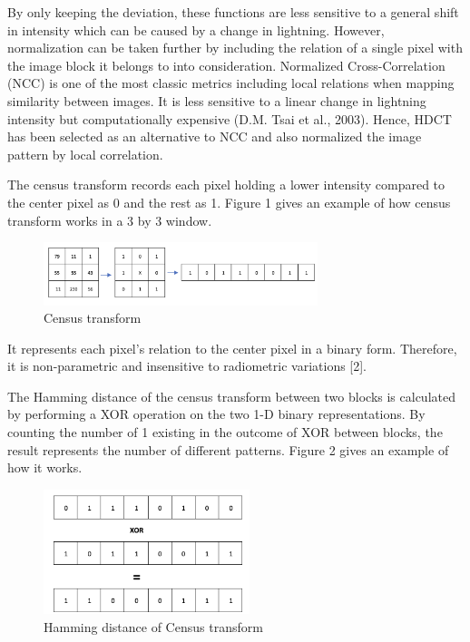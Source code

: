 \documentclass[conference]{IEEEtran}
\begin{document}
By only keeping the deviation, these functions are less sensitive to a general shift in intensity which can be caused by a change in lightning. However, normalization can be taken further by including the relation of a single pixel with the image block it belongs to into consideration. Normalized Cross-Correlation (NCC) is one of the most classic metrics including local relations when mapping similarity between images. It is less sensitive to a linear change in lightning intensity but computationally expensive (D.M. Tsai et al., 2003). Hence, HDCT has been selected as an alternative to NCC and also normalized the image pattern by local correlation. 

The census transform records each pixel holding a lower intensity compared to the center pixel as 0 and the rest as 1. Figure 1 gives an example of how census transform works in a 3 by 3 window.

\begin{figure}[H]
    \centering
    \includegraphics[width=8cm]{fig1.png}
    \caption{Census transform}
\end{figure}

It represents each pixel's relation to the center pixel in a binary form. Therefore, it is non-parametric and insensitive to radiometric variations [2].

The Hamming distance of the census transform between two blocks is calculated by performing a XOR operation on the two 1-D binary representations. By counting the number of 1 existing in the outcome of XOR between blocks, the result represents the number of different patterns. Figure 2 gives an example of how it works.

\begin{figure}[H]
    \centering
    \includegraphics[width=6cm]{fig2.png}
    \caption{Hamming distance of Census transform}
\end{figure}
\end{document}
